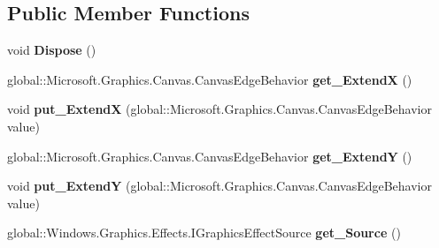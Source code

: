 \subsection*{Public Member Functions}
\begin{DoxyCompactItemize}
\item 
\mbox{\label{class_microsoft_1_1_graphics_1_1_canvas_1_1_effects_1_1_border_effect_a8395460dd5965cd4aacc0875a1c0b680}} 
void {\bfseries Dispose} ()
\item 
\mbox{\label{class_microsoft_1_1_graphics_1_1_canvas_1_1_effects_1_1_border_effect_a9b8cb2410a4d2443829d9eeecfd0733e}} 
global\+::\+Microsoft.\+Graphics.\+Canvas.\+Canvas\+Edge\+Behavior {\bfseries get\+\_\+\+ExtendX} ()
\item 
\mbox{\label{class_microsoft_1_1_graphics_1_1_canvas_1_1_effects_1_1_border_effect_af4f6600839db25402d0fb39ed1fd5542}} 
void {\bfseries put\+\_\+\+ExtendX} (global\+::\+Microsoft.\+Graphics.\+Canvas.\+Canvas\+Edge\+Behavior value)
\item 
\mbox{\label{class_microsoft_1_1_graphics_1_1_canvas_1_1_effects_1_1_border_effect_aa62a4c26a2f87c325e90e8a2ef7348d0}} 
global\+::\+Microsoft.\+Graphics.\+Canvas.\+Canvas\+Edge\+Behavior {\bfseries get\+\_\+\+ExtendY} ()
\item 
\mbox{\label{class_microsoft_1_1_graphics_1_1_canvas_1_1_effects_1_1_border_effect_aaae1874ec7b1b2630d7636442f2c79c0}} 
void {\bfseries put\+\_\+\+ExtendY} (global\+::\+Microsoft.\+Graphics.\+Canvas.\+Canvas\+Edge\+Behavior value)
\item 
\mbox{\label{class_microsoft_1_1_graphics_1_1_canvas_1_1_effects_1_1_border_effect_ad3238a486519b9e346560be58abbd303}} 
global\+::\+Windows.\+Graphics.\+Effects.\+I\+Graphics\+Effect\+Source {\bfseries get\+\_\+\+Source} ()
\item 
\mbox{\label{class_microsoft_1_1_graphics_1_1_canvas_1_1_effects_1_1_border_effect_aff45744a28e3679714ecb278ca56bffc}} 

\end{DoxyCompactItemize}
